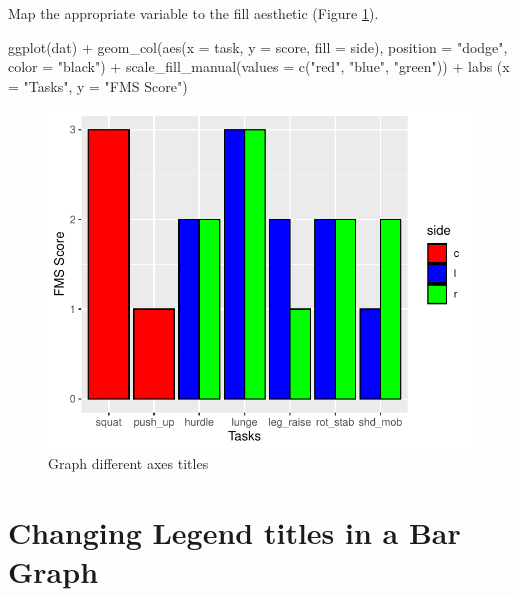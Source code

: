 \documentclass[
]{book}
\newenvironment{Shaded}{\begin{snugshade}}{\end{snugshade}}
\newcommand{\AttributeTok}[1]{\textcolor[rgb]{0.77,0.63,0.00}{#1}}
\newcommand{\FunctionTok}[1]{\textcolor[rgb]{0.00,0.00,0.00}{#1}}
\newcommand{\NormalTok}[1]{#1}
\newcommand{\SpecialCharTok}[1]{\textcolor[rgb]{0.00,0.00,0.00}{#1}}
\newcommand{\StringTok}[1]{\textcolor[rgb]{0.31,0.60,0.02}{#1}}
\begin{document}
Map the appropriate variable to the fill aesthetic (Figure \ref{fig:FIG-BAR-GRAPH-AXES}).

\begin{Shaded}
\begin{Highlighting}[]
\FunctionTok{ggplot}\NormalTok{(dat) }\SpecialCharTok{+}
  \FunctionTok{geom\_col}\NormalTok{(}\FunctionTok{aes}\NormalTok{(}\AttributeTok{x =}\NormalTok{ task, }\AttributeTok{y =}\NormalTok{ score, }\AttributeTok{fill =}\NormalTok{ side), }\AttributeTok{position =} \StringTok{"dodge"}\NormalTok{, }\AttributeTok{color =} \StringTok{"black"}\NormalTok{) }\SpecialCharTok{+}
  \FunctionTok{scale\_fill\_manual}\NormalTok{(}\AttributeTok{values =} \FunctionTok{c}\NormalTok{(}\StringTok{"red"}\NormalTok{, }\StringTok{"blue"}\NormalTok{, }\StringTok{"green"}\NormalTok{)) }\SpecialCharTok{+}
  \FunctionTok{labs}\NormalTok{ (}\AttributeTok{x =} \StringTok{"Tasks"}\NormalTok{,}
        \AttributeTok{y =} \StringTok{"FMS Score"}\NormalTok{)}
\end{Highlighting}
\end{Shaded}

\begin{figure}

{\centering \includegraphics{se201_stats_book_files/figure-latex/FIG-BAR-GRAPH-AXES-1} 

}

\caption[Graph different axes titles]{Graph different axes titles}\label{fig:FIG-BAR-GRAPH-AXES}
\end{figure}

\hypertarget{BAR-GRAPH-LEGEND}{%
\section{Changing Legend titles in a Bar Graph}\label{BAR-GRAPH-LEGEND}}
\end{document}
